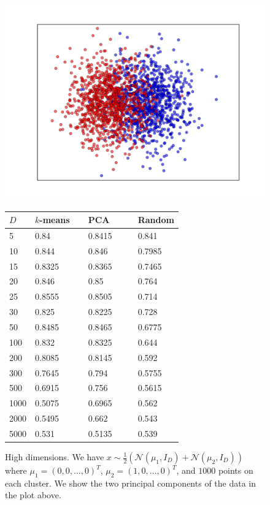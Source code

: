 \documentclass[aps,preprint,nofootinbib,floatfix]{revtex4-1}
\begin{document}
\begin{figure}
\begin{minipage}{.49\textwidth}
\includegraphics[scale=.45]{30d_gauss.pdf}
\end{minipage}
\begin{minipage}{.49\textwidth}
\renewcommand*{\arraystretch}{.3}
\begin{tabular}{ l l l l }
\hline
$D$ & $k$-means~~ & PCA~~~~  & Random \\
\hline
5 & 0.84 & 0.8415 & 0.841 \\
10 & 0.844 & 0.846 & 0.7985 \\
15 & 0.8325 & 0.8365 & 0.7465 \\
20 & 0.846 & 0.85 & 0.764 \\
25 & 0.8555 & 0.8505 & 0.714 \\
30 & 0.825 & 0.8225 & 0.728 \\
50 & 0.8485 & 0.8465 & 0.6775 \\
100 & 0.832 & 0.8325 & 0.644 \\
200 & 0.8085 & 0.8145 & 0.592 \\
300 & 0.7645 & 0.794 & 0.5755 \\
500 & 0.6915 & 0.756 & 0.5615 \\
1000 & 0.5075 & 0.6965 & 0.562 \\
2000 & 0.5495 & 0.662 & 0.543 \\
5000 & 0.531 & 0.5135 & 0.539 \\
\hline
\end{tabular}
\end{minipage}
\caption{\label{fig:highd}
High dimensions.
We have $x \sim \tfrac{1}{2}\left( \mathcal{N}(\mu_1, I_D) +
\mathcal{N}(\mu_2, I_D)\right)$ where $\mu_1 = (0,0,\dotsc,0)^T$,
$\mu_2=(1,0,\dots,0)^T$,
and $1000$ points on each cluster. We show the two principal components
of the data in the plot above.
}
\end{figure}
\end{document}
